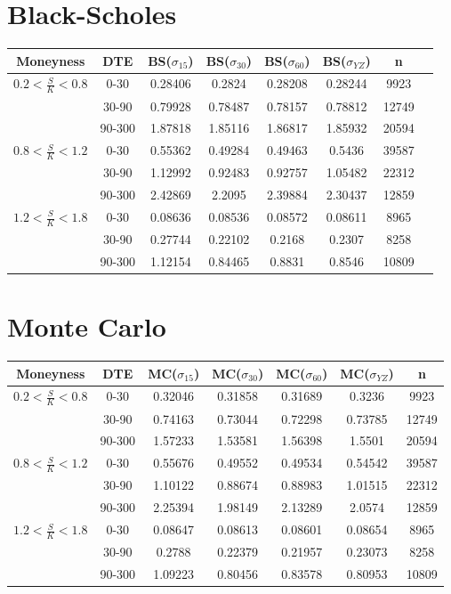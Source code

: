 \section{Black-Scholes}
\begin{center}
\begin{tabular}{c|c|c|c|c|c|c|c}
Moneyness & DTE & BS($\sigma_{15}$) & BS($\sigma_{30}$) & BS($\sigma_{60}$) & BS($\sigma_{YZ}$) & n \\
\hline
$0.2 < \frac{S}{K} < 0.8$ & 0-30 & 0.28406 & 0.2824 & 0.28208 & 0.28244 & 9923 \\
& 30-90 & 0.79928 & 0.78487 & 0.78157 & 0.78812 & 12749 \\
& 90-300 & 1.87818 & 1.85116 & 1.86817 & 1.85932 & 20594 \\
$0.8 < \frac{S}{K} < 1.2$ & 0-30 & 0.55362 & 0.49284 & 0.49463 & 0.5436 & 39587 \\
& 30-90 & 1.12992 & 0.92483 & 0.92757 & 1.05482 & 22312 \\
& 90-300 & 2.42869 & 2.2095 & 2.39884 & 2.30437 & 12859 \\
$1.2 < \frac{S}{K} < 1.8$ & 0-30 & 0.08636 & 0.08536 & 0.08572 & 0.08611 & 8965 \\
& 30-90 & 0.27744 & 0.22102 & 0.2168 & 0.2307 & 8258 \\
& 90-300 & 1.12154 & 0.84465 & 0.8831 & 0.8546 & 10809 \\
\end{tabular}
\end{center}

\section{Monte Carlo}
\begin{center}
\begin{tabular}{c|c|c|c|c|c|c}
Moneyness & DTE & MC($\sigma_{15}$) & MC($\sigma_{30}$) & MC($\sigma_{60}$) & MC($\sigma_{YZ}$) & n \\
\hline
$0.2 < \frac{S}{K} < 0.8$ & 0-30 & 0.32046 & 0.31858 & 0.31689 & 0.3236 & 9923 \\
& 30-90 & 0.74163 & 0.73044 & 0.72298 & 0.73785 & 12749 \\
& 90-300 & 1.57233 & 1.53581 & 1.56398 & 1.5501 & 20594 \\
$0.8 < \frac{S}{K} < 1.2$ & 0-30 & 0.55676 & 0.49552 & 0.49534 & 0.54542 & 39587 \\
& 30-90 & 1.10122 & 0.88674 & 0.88983 & 1.01515 & 22312 \\
& 90-300 & 2.25394 & 1.98149 & 2.13289 & 2.0574 & 12859 \\
$1.2 < \frac{S}{K} < 1.8$ & 0-30 & 0.08647 & 0.08613 & 0.08601 & 0.08654 & 8965 \\
& 30-90 & 0.2788 & 0.22379 & 0.21957 & 0.23073 & 8258 \\
& 90-300 & 1.09223 & 0.80456 & 0.83578 & 0.80953 & 10809 \\
\end{tabular} 
\end{center}

